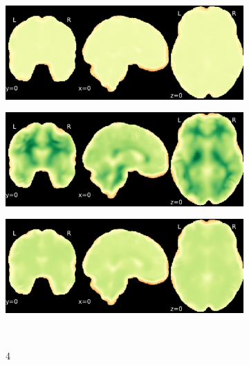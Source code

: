 \documentclass{article}
\begin{document}
\begin{appendices}
\begin{landscape}
\begin{figure}
\begin{subfigure}[t]{0.2\paperheight}
            \end{subfigure}
            \begin{subfigure}[t]{0.2\paperheight}
                \centering
                \includegraphics[width=\textwidth]{figures/sig/10mm/rr_ds000256_sub-CTS201_sig.pdf}
            \end{subfigure}
            \begin{subfigure}[t]{0.2\paperheight}
                \centering
                \includegraphics[width=\textwidth]{figures/sig/10mm/rs_ds000256_sub-CTS201_sig.pdf}
            \end{subfigure}
            \begin{subfigure}[t]{0.2\paperheight}
                \centering
                \includegraphics[width=\textwidth]{figures/sig/10mm/rr.rs_ds000256_sub-CTS201_sig.pdf}
            \end{subfigure} \\
            \begin{subfigure}[b][][c]{0.01\paperwidth} 4 \vspace*{15pt} \end{subfigure}

\end{figure}
\end{landscape}
\end{appendices}
\end{document}
